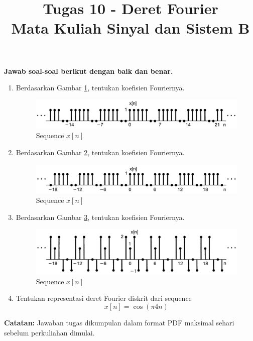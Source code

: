 \documentclass[12pt,a4paper]{article}
\title{Tugas 10 - Deret Fourier\\
	\large Mata Kuliah Sinyal dan Sistem B}
\begin{document}
	\maketitle
	\textbf{Jawab soal-soal berikut dengan baik dan benar.}
	\begin{enumerate}
		\item Berdasarkan Gambar \ref{fig:img01}, tentukan koefisien Fouriernya.
		\begin{figure}[h]
			\centering
			\includegraphics[width=\linewidth]{img/img01}
			\caption[shot]{Sequence $ x[n] $}
			\label{fig:img01}
		\end{figure}
		\item Berdasarkan Gambar \ref{fig:img02}, tentukan koefisien Fouriernya.
		\begin{figure}[h]
			\centering
			\includegraphics[width=\linewidth]{img/img02}
			\caption[shot]{Sequence $ x[n] $}
			\label{fig:img02}
		\end{figure}
		\item Berdasarkan Gambar \ref{fig:img03}, tentukan koefisien Fouriernya.
		\begin{figure}[h]
			\centering
			\includegraphics[width=\linewidth]{img/img03}
			\caption[shot]{Sequence $ x[n] $}
			\label{fig:img03}
		\end{figure}
		\item Tentukan representasi deret Fourier diskrit dari sequence
		\begin{equation*}
			x[n] = \cos( \pi4 n)
		\end{equation*}
		
	\end{enumerate}

	\textbf{Catatan:} Jawaban tugas dikumpulan dalam format PDF maksimal sehari sebelum perkuliahan dimulai.
\end{document}
